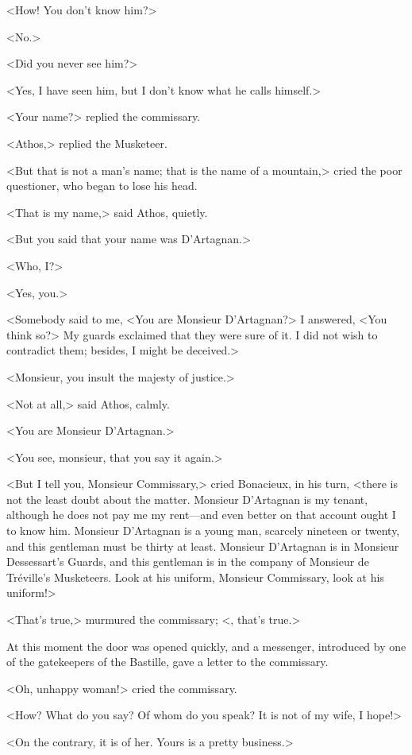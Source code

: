 <How! You don't know him?> 

<No.> 

<Did you never see him?> 

<Yes, I have seen him, but I don't know what he calls himself.> 

<Your name?> replied the commissary. 

<Athos,> replied the Musketeer. 

<But that is not a man's name; that is the name of a mountain,> cried the poor questioner, who began to lose his head. 

<That is my name,> said Athos, quietly. 

<But you said that your name was D'Artagnan.> 

<Who, I?> 

<Yes, you.> 

<Somebody said to me, <You are Monsieur D'Artagnan?> I answered, <You think so?> My guards exclaimed that they were sure of it. I did not wish to contradict them; besides, I might be deceived.> 

<Monsieur, you insult the majesty of justice.> 

<Not at all,> said Athos, calmly. 

<You are Monsieur D'Artagnan.> 

<You see, monsieur, that you say it again.> 

<But I tell you, Monsieur Commissary,> cried Bonacieux, in his turn, <there is not the least doubt about the matter. Monsieur D'Artagnan is my tenant, although he does not pay me my rent—and even better on that account ought I to know him. Monsieur D'Artagnan is a young man, scarcely nineteen or twenty, and this gentleman must be thirty at least. Monsieur D'Artagnan is in Monsieur Dessessart's Guards, and this gentleman is in the company of Monsieur de Tréville's Musketeers. Look at his uniform, Monsieur Commissary, look at his uniform!> 

<That's true,> murmured the commissary; <, that's true.> 

At this moment the door was opened quickly, and a messenger, introduced by one of the gatekeepers of the Bastille, gave a letter to the commissary. 

<Oh, unhappy woman!> cried the commissary. 

<How? What do you say? Of whom do you speak? It is not of my wife, I hope!> 

<On the contrary, it is of her. Yours is a pretty business.> 

